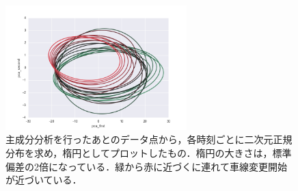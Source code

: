 \begin{figure}[htbp]
  \begin{center}
    \includegraphics[clip,width=7.0cm]{fig/pca_gauss.png}
    \caption{主成分分析を行ったあとのデータ点から，各時刻ごとに二次元正規分布を求め，楕円としてプロットしたもの．楕円の大きさは，標準偏差の2倍になっている．緑から赤に近づくに連れて車線変更開始が近づいている．}
    \label{fig:pca_gauss}
  \end{center}
\end{figure}
